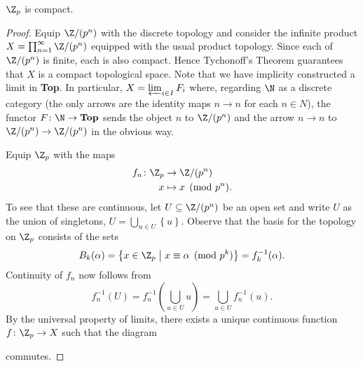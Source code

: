 \documentclass[10pt]{amsart}
\begin{document}
\setcounter{thm}{6}
\begin{thm}
  $\Z_p$ is compact.

  \begin{proof}
    Equip $\Z/(p^n)$ with the discrete topology and consider the infinite product $X = \prod_{n=1}^\infty \Z/(p^n)$ equipped with the usual product topology.
    Since each of $\Z/(p^n)$ is finite, each is also compact.
    Hence Tychonoff's Theorem guarantees that $X$ is a compact topological space.
    Note that we have implicity constructed a limit in {\bf Top}.
    In particular, $X = \varprojlim_{i \in I}F_i$ where, 
    regarding $\N$ as a discrete category (the only arrows are the identity maps $n \rightarrow n$ for each $n \in N$), 
    the functor $F \colon \N \rightarrow {\bf Top}$ sends the object $n$ to $\Z/(p^n)$ 
    and the arrow $n \rightarrow n$ to $\Z/(p^n) \rightarrow \Z/(p^n)$ in the obvious way.
    
    Equip $\Z_p$ with the maps
    \begin{align*}
      f_n \colon \Z_p  &\rightarrow \Z/(p^n)\\
      x &\mapsto x \pmod{p^n}.
    \end{align*}
    To see that these are continuous, let $U \subseteq \Z/(p^n)$ be an open set and write $U$ as the union of singletons, $U = \bigcup_{u \in U}\left\{u\right\}$.
    Observe that the basis for the topology on $\Z_p$ consists of the sets
    $$B_k(\alpha) = \left\{x \in \Z_p \;\middle\vert\; x \equiv \alpha \pmod{p^k}\right\} = f_k^{-1}(\alpha).$$
    Continuity of $f_n$ now follows from $$f_n^{-1}(U) = f_n^{-1}\left(\bigcup_{u \in U} u\right) = \bigcup_{u \in U} f_n^{-1}(u).$$
    By the universal property of limits, there exists a unique continuous function $f \colon \Z_p \rightarrow X$ such that the diagram 
    \begin{center}
    \end{center}  
    commutes.


\end{proof}
\end{thm}
\end{document}
